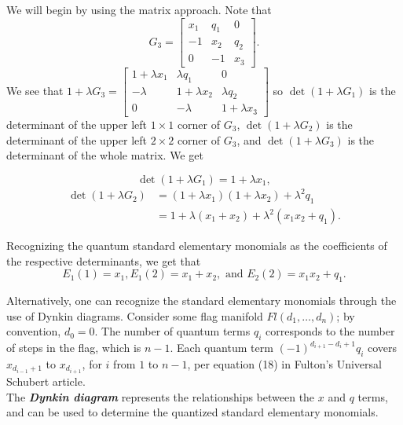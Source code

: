 \documentclass[11pt]{article}
\begin{document}
\begin{eg}

We will begin by using the matrix approach. Note that
\[
    G_3 = \begin{bmatrix}
    x_1 & q_1 & 0 \\
    -1 & x_2 & q_2 \\
    0 & -1 & x_3
    \end{bmatrix}.
\]
We see that $1 + \lambda G_3 = \begin{bmatrix}
    1 + \lambda x_1 & \lambda q_1 & 0 \\
    -\lambda & 1 + \lambda x_2 & \lambda q_2 \\
    0 & -\lambda & 1 + \lambda x_3
    \end{bmatrix}$
so $\det (1 + \lambda G_1)$ is the determinant of the upper left $1 \times 1$ corner of $G_3$, $\det (1 + \lambda G_2)$  is the determinant of the upper left $2 \times 2$ corner of $G_3$, and $\det (1 + \lambda G_3)$ is the determinant of the whole matrix. We get

\[
    \det (1 + \lambda G_1) = 1 + \lambda x_1,
\]
\begin{align*}
    \det (1 + \lambda G_2) &= (1+\lambda x_1)(1+\lambda x_2) + \lambda^2 q_1 \\
    &= 1 + \lambda (x_1 + x_2) + \lambda^2 (x_1x_2 + q_1).
\end{align*}

Recognizing the quantum standard elementary monomials as the coefficients of the respective determinants, we get that
\[
    \boxed{E_1(1) = x_1, E_1(2) = x_1 + x_2, \text{ and } E_2(2) = x_1x_2 + q_1}.
\]
\end{eg}

\vspace{0.5cm}
Alternatively, one can recognize the standard elementary monomials through the use of Dynkin diagrams. Consider some flag manifold $Fl(d_1, \dots, d_n)$; by convention, $d_0 = 0$. The number of quantum terms $q_i$ corresponds to the number of steps in the flag, which is $n-1$. Each quantum term $(-1)^{d_{i+1} - d_{i} + 1}q_i$ covers $x_{d_{i-1} + 1}$ to $x_{d_{i+1}}$, for $i$ from $1$ to $n-1$, per equation (18) in Fulton's Universal Schubert article. \\

The \textit{\textbf{Dynkin diagram}} represents the relationships between the $x$ and $q$ terms, and can be used to determine the quantized standard elementary monomials. \\
\end{document}
